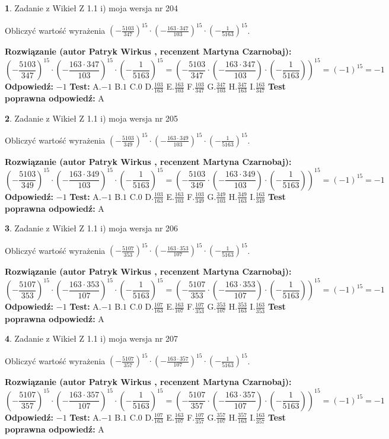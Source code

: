 \documentclass[12pt, a4paper]{article}
\theoremstyle{definition} %
\newtheorem{zad}{}
\newcommand{\zadStart}[1]{\begin{zad}#1\newline}
\newcommand{\zadStop}{\end{zad}}
\newcommand{\rozwStart}[2]{\noindent \textbf{Rozwiązanie (autor #1 , recenzent #2): }\newline}
\newcommand{\rozwStop}{\newline}
\newcommand{\odpStart}{\noindent \textbf{Odpowiedź:}\newline}
\newcommand{\odpStop}{\newline}
\newcommand{\testStart}{\noindent \textbf{Test:}\newline}
\newcommand{\testStop}{\newline}
\newcommand{\kluczStart}{\noindent \textbf{Test poprawna odpowiedź:}\newline}
\newcommand{\kluczStop}{\newline}
\begin{document}
\zadStart{Zadanie z Wikieł Z 1.1 i) moja wersja nr 204}

Obliczyć wartość wyrażenia $(-\frac{5103}{347})^{15} \cdot (-\frac{163 \cdot 347}{103})^{15} \cdot (-\frac{1}{5163})^{15}$.
\zadStop
\rozwStart{Patryk Wirkus}{Martyna Czarnobaj}
$$(-\frac{5103}{347})^{15} \cdot (-\frac{163 \cdot 347}{103})^{15} \cdot (-\frac{1}{5163})^{15} = (-\frac{5103}{347} \cdot (-\frac{163 \cdot 347}{103}) \cdot (-\frac{1}{5163}))^{15} = (-1)^{15} = -1$$
\rozwStop
\odpStart
$-1$
\odpStop
\testStart
A.$-1$ B.$1$ C.$0$ D.$\frac{103}{163}$ E.$\frac{163}{103}$
F.$\frac{103}{347}$ G.$\frac{347}{103}$
H.$\frac{347}{163}$
I.$\frac{163}{347}$
\testStop
\kluczStart
A
\kluczStop



\zadStart{Zadanie z Wikieł Z 1.1 i) moja wersja nr 205}

Obliczyć wartość wyrażenia $(-\frac{5103}{349})^{15} \cdot (-\frac{163 \cdot 349}{103})^{15} \cdot (-\frac{1}{5163})^{15}$.
\zadStop
\rozwStart{Patryk Wirkus}{Martyna Czarnobaj}
$$(-\frac{5103}{349})^{15} \cdot (-\frac{163 \cdot 349}{103})^{15} \cdot (-\frac{1}{5163})^{15} = (-\frac{5103}{349} \cdot (-\frac{163 \cdot 349}{103}) \cdot (-\frac{1}{5163}))^{15} = (-1)^{15} = -1$$
\rozwStop
\odpStart
$-1$
\odpStop
\testStart
A.$-1$ B.$1$ C.$0$ D.$\frac{103}{163}$ E.$\frac{163}{103}$
F.$\frac{103}{349}$ G.$\frac{349}{103}$
H.$\frac{349}{163}$
I.$\frac{163}{349}$
\testStop
\kluczStart
A
\kluczStop



\zadStart{Zadanie z Wikieł Z 1.1 i) moja wersja nr 206}

Obliczyć wartość wyrażenia $(-\frac{5107}{353})^{15} \cdot (-\frac{163 \cdot 353}{107})^{15} \cdot (-\frac{1}{5163})^{15}$.
\zadStop
\rozwStart{Patryk Wirkus}{Martyna Czarnobaj}
$$(-\frac{5107}{353})^{15} \cdot (-\frac{163 \cdot 353}{107})^{15} \cdot (-\frac{1}{5163})^{15} = (-\frac{5107}{353} \cdot (-\frac{163 \cdot 353}{107}) \cdot (-\frac{1}{5163}))^{15} = (-1)^{15} = -1$$
\rozwStop
\odpStart
$-1$
\odpStop
\testStart
A.$-1$ B.$1$ C.$0$ D.$\frac{107}{163}$ E.$\frac{163}{107}$
F.$\frac{107}{353}$ G.$\frac{353}{107}$
H.$\frac{353}{163}$
I.$\frac{163}{353}$
\testStop
\kluczStart
A
\kluczStop



\zadStart{Zadanie z Wikieł Z 1.1 i) moja wersja nr 207}

Obliczyć wartość wyrażenia $(-\frac{5107}{357})^{15} \cdot (-\frac{163 \cdot 357}{107})^{15} \cdot (-\frac{1}{5163})^{15}$.
\zadStop
\rozwStart{Patryk Wirkus}{Martyna Czarnobaj}
$$(-\frac{5107}{357})^{15} \cdot (-\frac{163 \cdot 357}{107})^{15} \cdot (-\frac{1}{5163})^{15} = (-\frac{5107}{357} \cdot (-\frac{163 \cdot 357}{107}) \cdot (-\frac{1}{5163}))^{15} = (-1)^{15} = -1$$
\rozwStop
\odpStart
$-1$
\odpStop
\testStart
A.$-1$ B.$1$ C.$0$ D.$\frac{107}{163}$ E.$\frac{163}{107}$
F.$\frac{107}{357}$ G.$\frac{357}{107}$
H.$\frac{357}{163}$
I.$\frac{163}{357}$
\testStop
\kluczStart
A
\kluczStop
\end{document}
